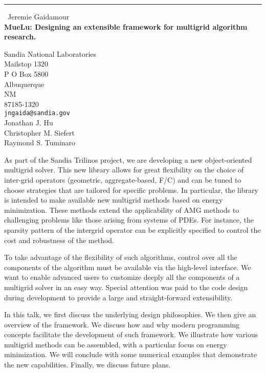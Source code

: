 \documentclass{report}
\begin{document}
\begin{center}
\rule{6in}{1pt} \
{\large Jeremie Gaidamour \\
{\bf MueLu: Designing an extensible framework for multigrid algorithm research.}}

Sandia National Laboratories \\ Mailstop 1320 \\ P O Box 5800 \\ Albuquerque \\ NM \\ 87185-1320
\\
{\tt jngaida@sandia.gov}\\
Jonathan J. Hu\\
Christopher M. Siefert\\
Raymond S. Tuminaro\end{center}

As part of the Sandia Trilinos project, we are developing a new
object-oriented multigrid solver. This new library allows for great
flexibility on the choice of inter-grid operators (geometric,
aggregate-based, F/C) and can be tuned to choose strategies that are
tailored for specific problems. In particular, the library is intended to
make available new multigrid methods based on energy minimization. These
methods extend the applicability of AMG methods to challenging problems
like those arising from systems of PDEs. For instance, the sparsity
pattern of the intergrid operator can be explicitly specified to control
the cost and robustness of the method.

To take advantage of the flexibility of such algorithms, control over all
the components of the algorithm must be available via the high-level
interface. We want to enable advanced users to customize deeply all the
components of a multigrid solver in an easy way. Special attention was
paid to the code design during development to provide a large and
straight-forward extensibility.

In this talk, we first discuss the underlying design philosophies. We
then give an overview of the framework. We discuss how and why modern
programming concepts facilitate the development of such framework. We
illustrate how various multigrid methods can be assembled, with a
particular focus on energy minimization. We will conclude with some
numerical examples that demonstrate the new capabilities. Finally, we
discuss future plans.
\end{document}
